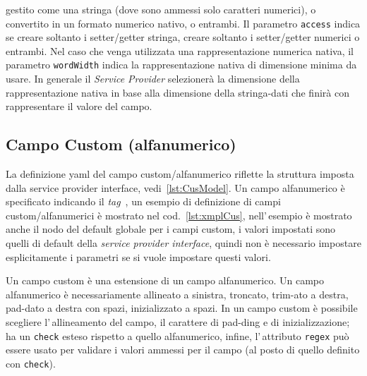 \documentclass[a4paper,10pt]{report}
\begin{document}
gestito come una stringa (dove sono ammessi solo caratteri numerici), o 
convertito in un formato numerico nativo, o entrambi. Il parametro 
\texttt{access} indica se creare soltanto i setter/getter stringa, creare 
soltanto i setter/getter numerici o entrambi.
Nel caso che venga utilizzata una rappresentazione numerica nativa, il parametro
\texttt{wordWidth} indica la rappresentazione nativa di dimensione minima da 
usare.
In generale il \textsl{Service Provider} selezionerà la dimensione della
rappresentazione nativa in base alla dimensione della stringa-dati che finirà 
con rappresentare il valore del campo.


\subsection{Campo Custom (alfanumerico)} \label{sub:yaml.cus}
La definizione yaml del campo custom/alfanumerico riflette la struttura imposta 
dalla service provider interface, vedi~\ref{lst:CusModel}.
Un campo alfanumerico è specificato indicando il \textsl{tag} 
\,, 
un esempio di definizione di campi custom/alfanumerici è mostrato nel 
cod.~\ref{lst:xmplCus}, nell'\,esempio è mostrato anche il nodo del default
globale per i campi custom, i valori impostati sono quelli di default
della \textsl{service provider interface}, quindi non è necessario impostare
esplicitamente i parametri se si vuole impostare questi valori.

Un campo custom è una estensione di un campo alfanumerico. Un campo alfanumerico
è necessariamente allineato a sinistra, troncato, trim-ato a destra, pad-dato a
destra con spazi, inizializzato a spazi. In un campo custom è possibile 
scegliere l'\,allineamento del campo, il carattere di  pad-ding e di 
inizializzazione; ha un \texttt{check} esteso rispetto a quello alfanumerico,
infine, l'\,attributo \texttt{regex} può essere usato per validare i valori
ammessi per il campo (al posto di quello definito con \texttt{check}).
\end{document}
